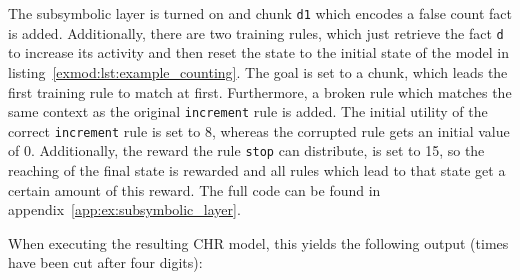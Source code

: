 The subsymbolic layer is turned on and chunk \lstinline|d1| which encodes a false count fact is added. Additionally, there are two training rules, which just retrieve the fact \lstinline|d| to increase its activity and then reset the state to the initial state of the model in listing~\ref{exmod:lst:example_counting}. The goal is set to a chunk, which leads the first training rule to match at first. Furthermore, a broken rule which matches the same context as the original \lstinline|increment| rule is added. The initial utility of the correct \lstinline|increment| rule is set to 8, whereas the corrupted rule gets an initial value of 0. Additionally, the reward the rule \lstinline|stop| can distribute, is set to 15, so the reaching of the final state is rewarded and all rules which lead to that state get a certain amount of this reward. The full code can be found in appendix~\ref{app:ex:subsymbolic_layer}. 

When executing the resulting CHR model, this yields the following output (times have been cut after four digits):

